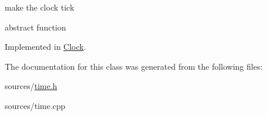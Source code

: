 make the clock tick 

abstract function 

Implemented in \hyperlink{classClock_af0ac46dd780987f2daa69d580e4d5d51}{Clock}.



The documentation for this class was generated from the following files:\begin{DoxyCompactItemize}
\item 
sources/\hyperlink{time_8h}{time.h}\item 
sources/time.cpp\end{DoxyCompactItemize}
